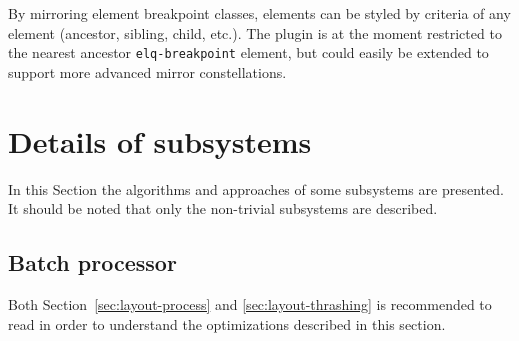 \documentclass[a4paper,11pt]{kth-mag}
\newcommand{\code}[1]{\texttt{#1}}
\begin{document}
          By mirroring element breakpoint classes, \glspl{element} can be styled by criteria of any element (ancestor, sibling, child, etc.).
          The plugin is at the moment restricted to the nearest ancestor \code{elq-breakpoint} \gls{element}, but could easily be extended to support more advanced mirror constellations.
    \section{Details of subsystems}\label{sec:library-imp-details}
      In this Section the algorithms and approaches of some subsystems are presented.
      It should be noted that only the non-trivial subsystems are described.

      \subsection{Batch processor}\label{sec:imp_batch_processor}
        Both Section~\ref{sec:layout-process} and \ref{sec:layout-thrashing} is recommended to read in order to understand the optimizations described in this section.
\end{document}
